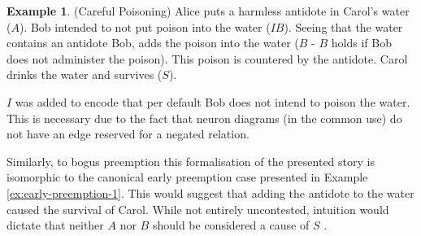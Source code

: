 \documentclass[11pt,a4paper]{book}
\theoremstyle{definition}
\theoremstyle{definition}
\newtheorem{example}{Example}[section]
\theoremstyle{definition}
\theoremstyle{remark}
\begin{document}
\begin{example}(Careful Poisoning)
\label{ex:short-circuit-0}
Alice puts a harmless antidote in Carol's water ($A$). Bob intended to not put poison into the water ($IB$).
Seeing that the water contains an antidote Bob, adds the poison into the water ($B$ - $B$ holds if Bob does not administer the poison). 
This poison is countered by the antidote.  
Carol drinks the water and survives ($S$).
\begin{center}
\end{center}
$I$ was added to encode that per default Bob does not intend to poison the water. This is necessary due to the fact that neuron diagrams (in the common use) do not have an edge reserved for a negated relation.
\end{example}


Similarly, to bogus preemption this formalisation of the presented story is isomorphic to the canonical early preemption case presented in Example \ref{ex:early-preemption-1}.
This would suggest that adding the antidote to the water caused the survival of Carol. While not entirely uncontested, intuition would dictate that neither $A$ nor $B$ should be considered a cause of $S$ \parencite{beckers2018principled}.
\end{document}
